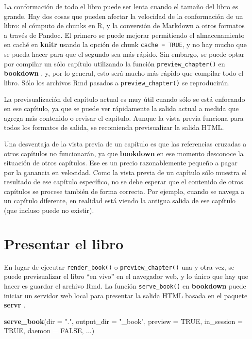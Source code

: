 \documentclass[12pt,]{krantz}
\makeatletter
\newenvironment{Shaded}{\begin{snugshade}}{\end{snugshade}}
\newcommand{\KeywordTok}[1]{\textcolor[rgb]{0.13,0.29,0.53}{\textbf{{#1}}}}
\newcommand{\DataTypeTok}[1]{\textcolor[rgb]{0.13,0.29,0.53}{{#1}}}
\newcommand{\StringTok}[1]{\textcolor[rgb]{0.31,0.60,0.02}{{#1}}}
\newcommand{\OtherTok}[1]{\textcolor[rgb]{0.56,0.35,0.01}{{#1}}}
\newcommand{\NormalTok}[1]{{#1}}
\newenvironment{kframe}{%
\medskip{}
\setlength{\fboxsep}{.8em}
 \def\at@end@of@kframe{}%
 \ifinner\ifhmode%
  \def\at@end@of@kframe{\end{minipage}}%
  \begin{minipage}{\columnwidth}%
 \fi\fi%
 \def\FrameCommand##1{\hskip\@totalleftmargin \hskip-\fboxsep
 \colorbox{shadecolor}{##1}\hskip-\fboxsep
     \hskip-\linewidth \hskip-\@totalleftmargin \hskip\columnwidth}%
 \MakeFramed {\advance\hsize-\width
   \@totalleftmargin\z@ \linewidth\hsize
   \@setminipage}}%
 {\par\unskip\endMakeFramed%
 \at@end@of@kframe}
\renewenvironment{Shaded}{\begin{kframe}}{\end{kframe}}
\theoremstyle{definition}
\theoremstyle{definition}
\theoremstyle{remark}
\makeatother
\begin{document}
La conformación de todo el libro puede ser lenta cuando el tamaño del
libro es grande. Hay dos cosas que pueden afectar la velocidad de la
conformación de un libro: el cómputo de chunks en R, y la conversión de
Markdown a otros formatos a través de Pandoc. El primero se puede
mejorar permitiendo el almacenamiento en caché en \textbf{knitr} usando
la opción de chunk \texttt{cache\ =\ TRUE}, y no hay mucho que se pueda
hacer para que el segundo sea más rápido. Sin embargo, se puede optar
por compilar un sólo capítulo utilizando la función
\texttt{preview\_chapter()} en \textbf{bookdown} , y, por lo general,
esto será mucho más rápido que compilar todo el libro. Sólo los archivos
Rmd pasados a \texttt{preview\_chapter()} se reproducirán.

La previsualización del capítulo actual es muy útil cuando sólo se está
enfocando en ese capítulo, ya que se puede ver rápidamente la salida
actual a medida que agrega más contenido o revisar el capítulo. Aunque
la vista previa funciona para todos los formatos de salida, se
recomienda previsualizar la salida HTML.

Una desventaja de la vista previa de un capítulo es que las referencias
cruzadas a otros capítulos no funcionarán, ya que \textbf{bookdown} en
ese momento desconoce la situación de otros capítulos. Ese es un precio
razonablemente pequeño a pagar por la ganancia en velocidad. Como la
vista previa de un capítulo sólo muestra el resultado de ese capítulo
específico, no se debe esperar que el contenido de otros capítulos se
procese también de forma correcta. Por ejemplo, cuando se navega a un
capítulo diferente, en realidad está viendo la antigua salida de ese
capítulo (que incluso puede no existir).

\section{Presentar el libro}\label{presentar-el-libro}

En lugar de ejecutar \texttt{render\_book()} o
\texttt{preview\_chapter()} una y otra vez, se puede previsualizar el
libro ``en vivo'' en el navegador web, y lo único que hay que hacer es
guardar el archivo Rmd. La función \texttt{serve\_book()} en
\textbf{bookdown} puede iniciar un servidor web local para presentar la
salida HTML basada en el paquete \textbf{servr} \citep{R-servr}.

\begin{Shaded}
\begin{Highlighting}[]
\KeywordTok{serve_book}\NormalTok{(}\DataTypeTok{dir =} \StringTok{"."}\NormalTok{, }\DataTypeTok{output_dir =} \StringTok{"_book"}\NormalTok{, }\DataTypeTok{preview =} \OtherTok{TRUE}\NormalTok{, }
  \DataTypeTok{in_session =} \OtherTok{TRUE}\NormalTok{, }\DataTypeTok{daemon =} \OtherTok{FALSE}\NormalTok{, ...)}
\end{Highlighting}
\end{Shaded}
\end{document}
